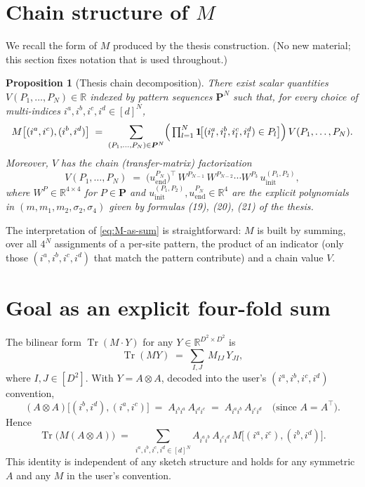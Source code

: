 \documentclass[11pt]{article}
\newtheorem{proposition}[theorem]{Proposition}
\DeclareMathOperator{\Tr}{Tr}
\newcommand{\IR}{\mathbb{R}}
\newcommand{\bP}{\boldsymbol{P}}
\begin{document}
\section{Chain structure of $M$}\label{sec:M-chain}

We recall the form of $M$ produced by the thesis construction. (No new
material; this section fixes notation that is used throughout.)

\begin{proposition}[Thesis chain decomposition]\label{prop:M-chain}
There exist scalar quantities $V(P_1,\dots,P_N)\in\IR$ indexed by pattern
sequences $\bP^N$ such that, for every choice of multi-indices
$i^a,i^b,i^c,i^d\in[d]^N$,
\begin{equation}\label{eq:M-as-sum}
M\bigl[(i^a,i^c),(i^b,i^d)\bigr]
\;=\;
\sum_{(P_1,\dots,P_N)\in\bP^N}
\Bigl(\,\textstyle\prod_{l=1}^N \mathbf{1}\!\bigl[(i^a_l,i^b_l,i^c_l,i^d_l)\in P_l\bigr]\Bigr)
\,V(P_1,\dots,P_N).
\end{equation}
Moreover, $V$ has the chain (transfer-matrix) factorization
\begin{equation}\label{eq:V-chain}
V(P_1,\dots,P_N)
\;=\;
\bigl(u_{\mathrm{end}}^{P_N}\bigr)^{\!\top}\,
W^{P_{N-1}}\, W^{P_{N-2}}\cdots W^{P_3}\,
u_{\mathrm{init}}^{(P_1,P_2)},
\end{equation}
where $W^P\in\IR^{4\times 4}$ for $P\in\bP$ and
$u_{\mathrm{init}}^{(P_1,P_2)}, u_{\mathrm{end}}^{P_N}\in\IR^4$
are the explicit polynomials in $(m,m_1,m_2,\sigma_2,\sigma_4)$ given
by formulas (19), (20), (21) of the thesis.
\end{proposition}

The interpretation of \eqref{eq:M-as-sum} is straightforward: $M$ is built
by summing, over all $4^N$ assignments of a per-site pattern, the product
of an indicator (only those $(i^a,i^b,i^c,i^d)$ that match the pattern
contribute) and a chain value $V$.

\section{Goal as an explicit four-fold sum}\label{sec:goal}

The bilinear form $\Tr(M\cdot Y)$ for any $Y\in\IR^{D^2\times D^2}$ is
\[
\Tr(M Y) \;=\; \sum_{I,J}\, M_{IJ}\,Y_{JI},
\]
where $I,J\in[D^2]$. With $Y = A\otimes A$, decoded into the user's
$(i^a,i^b,i^c,i^d)$ convention,
\[
(A\otimes A)\bigl[(i^b,i^d),(i^a,i^c)\bigr] \;=\;
A_{i^b i^a}\,A_{i^d i^c} \;=\; A_{i^a i^b}\,A_{i^c i^d}
\quad\text{(since $A=A^\top$)}.
\]
Hence
\begin{equation}\label{eq:trMB-base}
\Tr\bigl(M(A\otimes A)\bigr)
\;=\;
\sum_{i^a,i^b,i^c,i^d \in [d]^N}
A_{i^a i^b}\,A_{i^c i^d}\,
M\bigl[(i^a,i^c),(i^b,i^d)\bigr].
\end{equation}
This identity is independent of any sketch structure and holds for any
symmetric $A$ and any $M$ in the user's convention.
\end{document}
